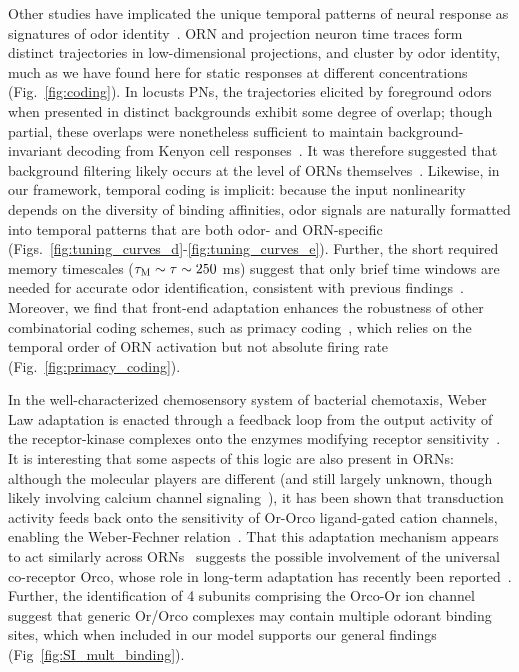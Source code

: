 \documentclass[10pt,prl,aps,showpacs,twocolumn,unsortedaddress,showkeys,linenumbers]{revtex4-1}
\begin{document}
Other studies have implicated the unique temporal patterns of neural response as signatures of odor identity~\cite{stopfer_temporal_model, multiple_timescales_stopfer, stopfer_nat_neuro, stopfer_temporal_channel}. ORN and projection neuron time traces form distinct trajectories in low-dimensional projections, and cluster by odor identity, {\color {blue} 
much as we have found here for static responses at different concentrations
}
(Fig.~\ref{fig:coding}). In locusts PNs, the trajectories elicited by foreground odors when presented in distinct backgrounds exhibit some degree of overlap; though partial, these overlaps were nonetheless sufficient to maintain background-invariant decoding from Kenyon cell responses~\cite{coding_background}. It was therefore suggested that background filtering likely occurs at the level of ORNs themselves~\cite{coding_background}. Likewise, in our framework, temporal coding is implicit: because the input nonlinearity depends on the diversity of binding affinities, %
odor signals are naturally formatted into temporal patterns that are both odor- and ORN-specific  (Figs.~\ref{fig:tuning_curves_d}-\ref{fig:tuning_curves_e}). Further, the short required memory timescales  ($\tau_{\textup M} \sim \tau \sim 250$ ms) suggest that only brief time windows are needed for accurate odor identification, consistent with previous findings~\cite{stopfer_nat_neuro, coding_background}. Moreover, we find that front-end adaptation enhances the robustness of other combinatorial coding schemes, such as primacy coding~\cite{primacy_coding}, which relies on the temporal order of ORN activation but not absolute firing rate (Fig.~\ref{fig:primacy_coding}).

In the well-characterized chemosensory system of bacterial chemotaxis, Weber Law adaptation is enacted through a feedback loop from the output activity of the receptor-kinase complexes onto the enzymes modifying receptor sensitivity~\cite{EmonetReview}. It is interesting that some aspects of this logic are also present in ORNs: although the molecular players are different 
{\color {blue} 
(and still largely unknown, though likely involving calcium channel signaling~\cite{cao_WL}), 
}
it has been shown that transduction activity feeds back onto the sensitivity of Or-Orco ligand-gated cation channels, enabling the Weber-Fechner relation~\cite{nagel_wilson_biophysical,srinivas_elife,cao_WL}. 
That this adaptation mechanism appears to act similarly across ORNs~\cite{srinivas_elife,martelli,cao_WL} suggests the possible involvement of the universal co-receptor Orco, whose role in long-term adaptation has recently been reported~\cite{getahun2013insect,getahun2016intracellular,Guo_Smith}. Further, the identification of 4 subunits comprising the Orco-Or ion channel suggest that generic Or/Orco complexes may contain multiple odorant binding sites, which when included in our model supports our general findings (Fig~\ref{fig:SI_mult_binding}).
\end{document}
